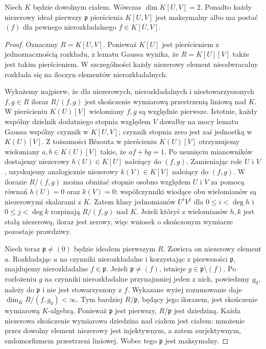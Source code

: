 \begin{lemat}
\label{aa:lem:krull-plane-dimension}
Niech $K$ będzie dowolnym ciałem. Wówczas
$\dim K[U,V]=2$. Ponadto każdy niezerowy ideał pierwszy
$\mathfrak p$ pierścienia $K[U,V]$ jest maksymalny albo ma
postać $(f)$ dla pewnego nierozkładalnego $f\in K[U,V]$.
\end{lemat}
\begin{proof}
Oznaczmy $R=K[U,V]$. Ponieważ $K[U]$ jest pierścieniem
z jednoznacznością rozkładu, z lematu Gaussa wynika, że
$R=K[U][V]$ także jest takim pierścieniem. W szczególności
każdy niezerowy element nieodwracalny rozkłada się na
iloczyn elementów nierozkładalnych.

Wykażemy najpierw, że dla niezerowych, nierozkładalnych
i niestowarzyszonych $f,g\in R$ iloraz $R/(f,g)$ jest
skończenie wymiarową przestrzenią liniową nad $K$.
W pierścieniu $K(U)[V]$ wielomiany $f,g$ są względnie
pierwsze. Istotnie, każdy wspólny dzielnik dodatniego stopnia
względem $V$ dawałby na mocy lematu Gaussa wspólny czynnik
w $K[U,V]$; czynnik stopnia zero jest zaś jednostką
w $K(U)[V]$. Z tożsamości Bézouta w pierścieniu
$K(U)[V]$ otrzymujemy wielomiany $a,b\in K(U)[V]$ takie,
że $af+bg=1$. Po usunięciu mianowników dostajemy
niezerowy $h(U)\in K[U]$ należący do $(f,g)$.
Zamieniając role $U$ i $V$, uzyskujemy analogicznie
niezerowy $k(V)\in K[V]$ należący do $(f,g)$.
W ilorazie $R/(f,g)$ można obniżać stopnie osobno względem
$U$ i $V$ za pomocą równań $h(U)=0$ oraz $k(V)=0$:
współczynniki wiodące obu wielomianów są niezerowymi
skalarami z $K$. Zatem klasy jednomianów
$U^iV^j$ dla $0\le i<\deg h$ i $0\le j<\deg k$
rozpinają $R/(f,g)$ nad $K$. Jeżeli któryś z wielomianów
$h,k$ jest stałą niezerową, iloraz jest zerowy, więc
wniosek o skończonym wymiarze pozostaje prawdziwy.

Niech teraz $\mathfrak p\ne(0)$ będzie ideałem pierwszym $R$.
Zawiera on niezerowy element $a$. Rozkładając $a$ na
czynniki nierozkładalne i korzystając z pierwszości
$\mathfrak p$, znajdujemy nierozkładalne $f\in\mathfrak p$.
Jeżeli $\mathfrak p\ne(f)$, istnieje
$g\in\mathfrak p\setminus(f)$. Po rozłożeniu $g$ na
czynniki nierozkładalne przynajmniej jeden z nich,
powiedzmy $g_0$, należy do $\mathfrak p$ i nie jest
stowarzyszony z $f$. Wykazane wyżej rozumowanie daje
$\dim_K R/(f,g_0)<\infty$. Tym bardziej
$R/\mathfrak p$, będący jego ilorazem, jest skończenie
wymiarową $K$-algebrą. Ponieważ $\mathfrak p$ jest
pierwszy, $R/\mathfrak p$ jest dziedziną. Każda niezerowa
skończenie wymiarowa dziedzina nad ciałem jest ciałem:
mnożenie przez dowolny element niezerowy jest injektywnym,
a zatem surjektywnym, endomorfizmem przestrzeni liniowej.
Wobec tego $\mathfrak p$ jest maksymalny.


\end{proof}
